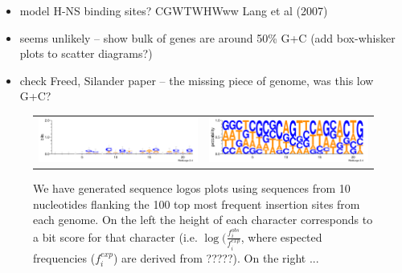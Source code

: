 \documentclass[12pt,letterpaper]{article}
\begin{document}
\begin{itemize}
\item model H-NS binding sites? CGWTWHWww Lang et al (2007)
\item seems unlikely -- show bulk of genes are around 50\% G+C (add box-whisker plots to scatter diagrams?)
\item check Freed, Silander paper -- the missing piece of genome, was this low G+C? 
\end{itemize}

\begin{figure}
\begin{tabular}{c c}
\includegraphics[scale=0.55]{100logo-bits.pdf}&
\includegraphics[scale=0.55]{100logo-prob.pdf}
\end{tabular}
\caption{We have generated sequence logos plots using sequences from 10 nucleotides flanking the 100 top most frequent insertion sites from each genome. On the left the height of each character corresponds to a bit score for that character (i.e. $\log(\frac{f^{obs}_{i}}{f^{exp}_{i}}$, where espected frequencies ($f^{exp}_{i}$) are derived from ?????). On the right ... }
\label{fig:logos}
\end{figure}
\end{document}
